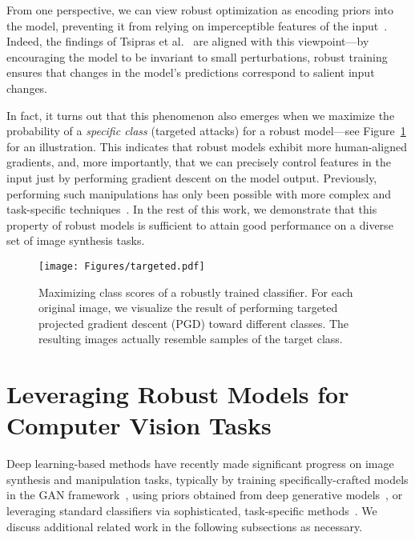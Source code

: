 \documentclass{article}
\begin{document}
From one perspective, we can view robust optimization as encoding priors into
the model, preventing it from relying on imperceptible features of the input~\cite{engstrom2019learning}.
Indeed, the findings of Tsipras et al.~\cite{tsipras2019robustness} are aligned
with this viewpoint---by encouraging the model to be invariant to small
perturbations, robust training ensures that changes in the model's predictions
correspond to salient input changes.

In fact, it turns out that this phenomenon also emerges when we maximize
the probability of a {\em specific class} (targeted attacks)
for a robust model---see Figure~\ref{fig:targeted} for an illustration.
This indicates that robust models exhibit more human-aligned
gradients, and, more importantly, that we can precisely control features
in the input just by performing gradient descent on the model output.
Previously, performing such manipulations has only been possible with more
complex and task-specific
techniques~\cite{mordvintsev2015inceptionism,radford2016unsupervised,isola2017image,zhu2017unpaired}. In the
rest of this work, we demonstrate that this property of robust models is
sufficient to attain good performance on a diverse set of image synthesis tasks.

\begin{figure}[!h]
	\texttt{[image: Figures/targeted.pdf]}
	\caption{Maximizing class scores of a robustly trained classifier.
		For each original image, we visualize the result of performing targeted 
        projected gradient descent (PGD) toward different classes. The resulting
    images actually resemble samples of the target class.}
	\label{fig:targeted}
\end{figure}


 
\section{Leveraging Robust Models for Computer Vision Tasks}
\label{sec:tasks}
Deep learning-based methods have recently made significant progress on
image synthesis and manipulation tasks, typically by training
specifically-crafted models in the {GAN}
framework~\cite{goodfellow2014generative,iizuka2017globally,
	zhu2017unpaired,yu2018generative,brock2019large}, using priors obtained from deep generative
models~\cite{nguyen2016synthesizing,nguyen2017plug,ulyanov2017deep,yeh2017semantic}, or leveraging standard
classifiers via sophisticated, task-specific
methods~\cite{mordvintsev2015inceptionism,oygard2015visualizing,tyka2016class,gatys2016image}.
We discuss additional related work in the following subsections as necessary.
\end{document}
